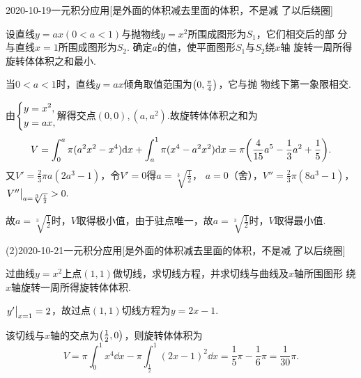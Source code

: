 \documentclass{ctexart}
\begin{document}
\begin{mathques}{2020-10-19}{一元积分应用}[是外面的体积减去里面的体积，不是减
  了以后绕圈]
\begin{ques}
  设直线$y = ax(0 < a < 1)$与抛物线$y = x^2$所围成图形为$S_1$，它们相交后的部
  分与直线$x = 1$所围成图形为$S_2$. 确定$a$的值，使平面图形$S_1$与$S_2$绕$x$轴
  旋转一周所得旋转体体积之和最小.
\end{ques}
\begin{solu}
  当$0 < a < 1$时，直线$y = ax$倾角取值范围为$\qty(0, \frac{\pi}{4})$，它与抛
  物线下第一象限相交.

  由$
  \begin{dcases}
  y = x^2,\\
  y = ax,
  \end{dcases}
  $解得交点$(0, 0), (a, a^2)$.故旋转体体积之和为
  \[
    V = \int_{0}^{a} \pi(a^2x^2 - x^4)\dd x + \int_{a}^{1}\pi(x^4 - a^2x^2)\dd
    x = \pi\qty(\frac{4}{15}a^5 - \frac{1}{3}a^2 + \frac{1}{5}).
  \]
  又$V' = \frac{2}{3}\pi a(2a^3 - 1)$，令$V' = 0$得$a = \sqrt[3]{\frac{1}{2}}$，
  $a = 0$（舍），$V'' = \frac{2}{3}\pi(8a^3 - 1)$，$\eval{V''}_{a = \sqrt[3]
  {\frac{1}{2}}} > 0.$

  故$a = \sqrt[3]{\frac{1}{2}}$时，$V$取得极小值，由于驻点唯一，故$a = \sqrt[3]
  {\frac{1}{2}}$时，$V$取得最小值.
\end{solu}
\end{mathques}

\begin{mathques}(2){2020-10-21}{一元积分应用}[是外面的体积减去里面的体积，不是减
  了以后绕圈]
\begin{ques}
  过曲线$y = x^2$上点$(1, 1)$做切线，求切线方程，并求切线与曲线及$x$轴所围图形
  绕$x$轴旋转一周所得旋转体体积.
\end{ques}
\begin{solu}
  $\eval{y'}_{x = 1} = 2$，故过点$(1, 1)$切线方程为$y = 2x - 1$.

  该切线与$x$轴的交点为$\qty(\frac{1}{2}, 0)$，则旋转体体积为
  \[
    V = \pi\int_{0}^{1}x^4\dd x - \pi\int_{\frac{1}{2}}^{1}(2x - 1)^2\dd x =
    \frac{1}{5}\pi - \frac{1}{6}\pi = \frac{1}{30}\pi.
  \]
\end{solu}
\end{mathques}
\end{document}
